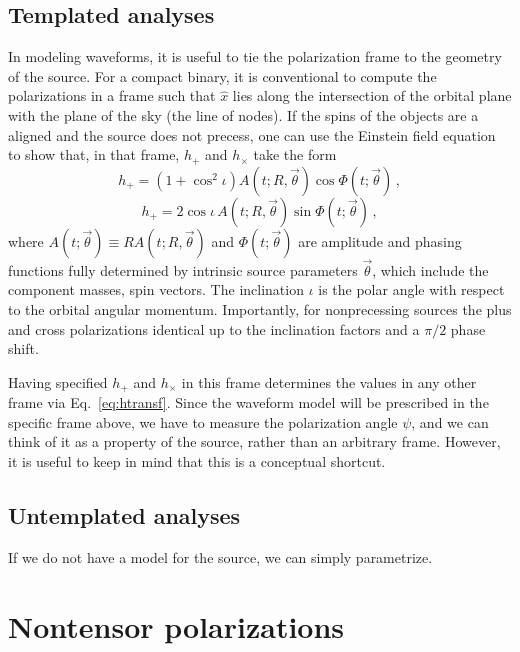 \documentclass[aps,prd,twocolumn,superscriptaddress,preprintnumbers,floatfix,nofootinbib]{revtex4-2}
\newcommand{\beq}{\begin{equation}}
\newcommand{\eeq}{\end{equation}}
\newcommand*{\eq}[1]{Eq.~\eqref{eq:#1}}
\begin{document}
\subsection{Templated analyses}

In modeling waveforms, it is useful to tie the polarization frame to the geometry of the source.
For a compact binary, it is conventional to compute the polarizations in a frame such that $\hat{x}$ lies along the intersection of the orbital plane with the plane of the sky (the line of nodes).
If the spins of the objects are a aligned and the source does not precess, one can use the Einstein field equation to show that, in that frame, $h_+$ and $h_\times$ take the form
\beq
h_+ = \left(1 + \cos^2 \iota\right) A(t; R, \vec{\theta}) \cos \Phi(t; \vec{\theta}) \, , 
\eeq
\beq
h_+ = 2 \cos \iota\, A(t; R, \vec{\theta}) \sin \Phi(t; \vec{\theta})\, ,
\eeq
where $A(t; \vec{\theta}) \equiv R  A(t; R, \vec{\theta})$ and $\Phi(t; \vec{\theta})$ are amplitude and phasing functions fully determined by intrinsic source parameters $\vec{\theta}$, which include the component masses, spin vectors.
The inclination $\iota$ is the polar angle with respect to the orbital angular momentum.
Importantly, for nonprecessing sources the plus and cross polarizations identical up to the inclination factors and a $\pi/2$ phase shift.

Having specified $h_+$ and $h_\times$ in this frame determines the values in any other frame via \eq{htransf}.
Since the waveform model will be prescribed in the specific frame above, we have to measure the polarization angle $\psi$, and we can think of it as a property of the source, rather than an arbitrary frame.
However, it is useful to keep in mind that this is a conceptual shortcut.

\subsection{Untemplated analyses}

If we do not have a model for the source, we can simply parametrize.

\section{Nontensor polarizations}

\newcommand{\hx}{h_{\rm x}}
\newcommand{\hy}{h_{\rm y}}
\newcommand{\hb}{h_{\rm b}}
\newcommand{\hlon}{h_{\rm l}}
\end{document}
